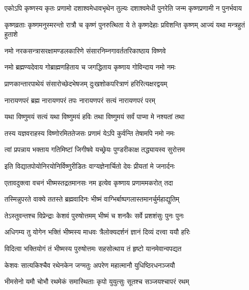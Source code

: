 \fourlineindentedshloka
{एकोऽपि कृष्णस्य कृतः प्रणामो}
{दशाश्वमेधावभृथेन तुल्यः}
{दशाश्वमेधी पुनरेति जन्म}
{कृष्णप्रणामी न पुनर्भवाय} %


\fourlineindentedshloka
{कृष्णव्रताः कृष्णमनुस्मरन्तो}
{रात्रौ च कृष्णं पुनरुत्थिता ये}
{ते कृष्णदेहाः प्रविशन्ति कृष्णम्}
{आज्यं यथा मन्त्रहुतं हुताशे} %


\twolineshloka
{नमो नरकसन्त्रासरक्षामण्डलकारिणे}
{संसारनिम्नगावर्ततरिकाष्ठाय विष्णवे} %


\twolineshloka
{नमो ब्रह्मण्यदेवाय गोब्राह्मणहिताय च}
{जगद्धिताय कृष्णाय गोविन्दाय नमो नमः} %


\twolineshloka
{प्राणकान्तारपाथेयं संसारोच्छेदभेषजम्}
{दुःखशोकपरित्राणं हरिरित्यक्षरद्वयम्} %


\twolineshloka
{नारायणपरं ब्रह्म नारायणपरं तपः}
{नारायणपरं सत्यं नारायणपरं परम्} %


\twolineshloka
{यथा विष्णुमयं सत्यं यथा विष्णुमयं हविः}
{तथा विष्णुमयं सर्वं पाप्मा मे नश्यतां तथा} %


\twolineshloka
{तस्य यज्ञवराहस्य विष्णोरमिततेजसः}
{प्रणामं येऽपि कुर्वन्ति तेषामपि नमो नमः} %


\twolineshloka
{त्वां प्रपन्नाय भक्ताय गतिमिष्टां जिगीषवे}
{यच्छ्रेयः पुण्डरीकाक्ष तद्ध्यायस्व सुरोत्तम} %


\twolineshloka
{इति विद्यातपोयोनिरयोनिर्विष्णुरीडितः}
{वाग्यज्ञेनार्चितो देवः प्रीयतां मे जनार्दनः} %


\twolineshloka
{एतावदुक्त्वा वचनं भीष्मस्तद्रतमानसः}
{नम इत्येव कृष्णाय प्रणाममकरोत् तदा} %


\twolineshloka
{तस्मिन्नुपरते वाक्ये ततस्ते ब्रह्मवादिनः}
{भीष्मं वाग्भिर्बाष्पगलास्तमानर्चुर्महाद्युतिम्} %


\twolineshloka
{तेऽस्तुवन्तश्च विप्रेन्द्राः केशवं पुरुषोत्तमम्}
{भीष्मं च शनकैः सर्वे प्रशशंसुः पुनः पुनः} %


\twolineshloka
{अधिगम्य तु योगेन भक्तिं भीष्मस्य माधवः}
{त्रैलोक्यदर्शनं ज्ञानं दिव्यं दत्त्वा ययौ हरिः} %


\twolineshloka
{विदित्वा भक्तियोगं तं भीष्मस्य पुरुषोत्तमः}
{सहसोत्थाय तं हृष्टो यानमेवान्वपद्यत} %


\twolineshloka
{केशवः सात्यकिश्चैव रथेनकेन जग्मतुः}
{अपरेण महात्मानौ युधिष्ठिरधनञ्जयौ} %


\twolineshloka
{भीमसेनो यमौ चोभौ रथमेकं समास्थिताः}
{कृपो युयुत्सुः सूतश्च सञ्जयश्चापरं रथम्} %


